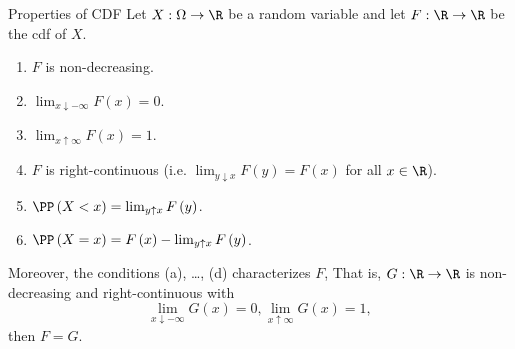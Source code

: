 \documentclass[stat901]{subfiles}
\begin{document}
    \begin{prop}{Properties of CDF}
        Let $X:\Omega\to\R$ be a random variable and let $F:\R\to\R$ be the cdf of $X$.
        \begin{enumerate}
            \item $F$ is non-decreasing.
            \item $\lim_{x\downarrow-\infty}F\left( x \right) = 0$.
            \item $\lim_{x\uparrow\infty}F\left( x \right) = 1$.
            \item $F$ is right-continuous (i.e. $\lim_{y\downarrow x}F\left( y \right) = F\left( x \right)$ for all $x\in\R$).
            \item $\PP\left( X<x \right) = \lim_{y\uparrow x}F\left( y \right)$.
            \item $\PP\left( X=x \right) = F\left( x \right) - \lim_{y\uparrow x}F\left( y \right)$.
        \end{enumerate}
        Moreover, the conditions (a), \ldots, (d) characterizes $F$, That is, $G:\R\to\R$ is non-decreasing and right-continuous with 
        \begin{equation*}
            \lim_{x\downarrow-\infty}G\left( x \right) = 0, \lim_{x\uparrow\infty}G\left( x \right) = 1,
        \end{equation*}
        then $F=G$.
    \end{prop}
\end{document}
